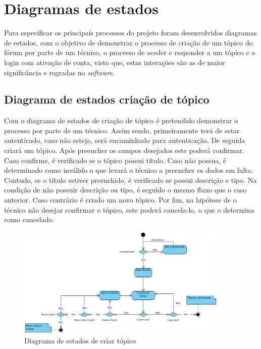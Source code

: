 \section{Diagramas de estados}
Para especificar os principais processos do projeto foram desenvolvidos diagramas de estados, com o objetivo de demonstrar o processo de criação de um tópico do fórum por parte de um técnico, o processo de aceder e responder a um tópico e o login com ativação de conta, visto que, estas interações são as de maior significância e regradas no \textit{software}.

\subsection{Diagrama de estados criação de tópico}

Com o diagrama de estados de criação de tópico é pretendido demonstrar o processo por parte de um técnico. Assim sendo, primeiramente terá de estar autenticado, caso não esteja, será encaminhado para autenticação. De seguida criará um tópico. Após preencher os campos desejados este poderá confirmar. Caso confirme, é verificado se o tópico possui título. Caso não possua, é determinado como inválido o que levará o técnico a preencher os dados em falta. Contudo, se o título estiver preenchido, é verificado se possui descrição e tipo. Na condição de não possuir descrição ou tipo, é seguido o mesmo fluxo que o caso anterior. Caso contrário é criado um novo tópico. Por fim, na hipótese de o técnico não desejar confirmar o tópico, este poderá cancela-lo, o que o determina como cancelado.

\begin{figure}[htb]
    \centering
    \includegraphics[width=0.9\textwidth]{images/diagramas/estados/criar_topico.png}
    \caption{Diagrama de estados de criar tópico}
    \label{fig:40}
\end{figure}

